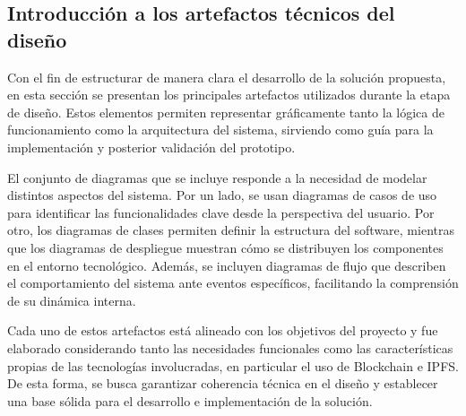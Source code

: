 \subsection{Introducción a los artefactos técnicos del diseño}
Con el fin de estructurar de manera clara el desarrollo de la solución propuesta, en esta sección se presentan los principales artefactos utilizados durante la etapa de diseño. Estos elementos permiten representar gráficamente tanto la lógica de funcionamiento como la arquitectura del sistema, sirviendo como guía para la implementación y posterior validación del prototipo.

El conjunto de diagramas que se incluye responde a la necesidad de modelar distintos aspectos del sistema. Por un lado, se usan diagramas de casos de uso para identificar las funcionalidades clave desde la perspectiva del usuario. Por otro, los diagramas de clases permiten definir la estructura del software, mientras que los diagramas de despliegue muestran cómo se distribuyen los componentes en el entorno tecnológico. Además, se incluyen diagramas de flujo que describen el comportamiento del sistema ante eventos específicos, facilitando la comprensión de su dinámica interna.

Cada uno de estos artefactos está alineado con los objetivos del proyecto y fue elaborado considerando tanto las necesidades funcionales como las características propias de las tecnologías involucradas, en particular el uso de Blockchain e IPFS. De esta forma, se busca garantizar coherencia técnica en el diseño y establecer una base sólida para el desarrollo e implementación de la solución.
